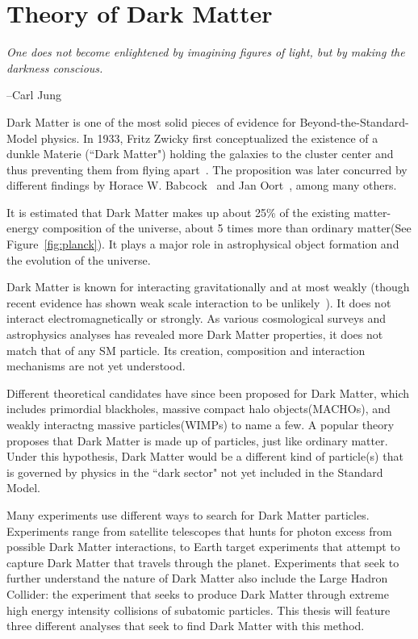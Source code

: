 \chapter{Theory of Dark Matter}
\label{chapter:DM}


\epigraph{\textit{One does not become enlightened by imagining figures of light, but by making the darkness conscious.}}{--Carl Jung}

Dark Matter is one of the most solid pieces of evidence for Beyond-the-Standard-Model physics. In 1933, Fritz Zwicky first conceptualized the existence of a dunkle Materie (``Dark Matter") holding the galaxies to the cluster center and thus preventing them from flying apart~\cite{Zwicky}. The proposition was later concurred by different findings by Horace W. Babcock~\cite{Babcock} and Jan Oort~\cite{oort}, among many others. 

It is estimated that Dark Matter makes up about 25\% of the existing matter-energy composition of the universe, about 5 times more than ordinary matter(See Figure~\ref{fig:planck}). It plays a major role in astrophysical object formation and the evolution of the universe. 

Dark Matter is known for interacting gravitationally and at most weakly (though recent evidence has shown weak scale interaction to be unlikely~\cite{DM2016}). It does not interact electromagnetically or strongly. As various cosmological surveys and astrophysics analyses has revealed more Dark Matter properties, it does not match that of any SM particle. Its creation, composition and interaction mechanisms are not yet understood.

Different theoretical candidates have since been proposed for Dark Matter, which includes primordial blackholes, massive compact halo objects(MACHOs), and weakly interactng massive particles(WIMPs) to name a few. A popular theory proposes that Dark Matter is made up of particles, just like ordinary matter. Under this hypothesis, Dark Matter would be a different kind of particle(s) that is governed by physics in the ``dark sector" not yet included in the Standard Model.

    Many experiments use different ways to search for Dark Matter particles. Experiments range from satellite telescopes that hunts for photon excess from possible Dark Matter interactions, to Earth target experiments that attempt to capture Dark Matter that travels through the planet. Experiments that seek to further understand the nature of Dark Matter also include the Large Hadron Collider: the experiment that seeks to produce Dark Matter through extreme high energy intensity collisions of
    subatomic particles. This thesis will feature three different analyses that seek to find Dark Matter with this method. 


